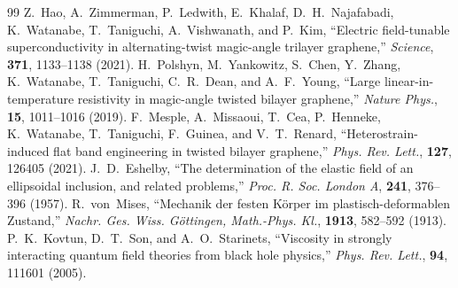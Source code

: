 \documentclass[12pt,a4paper]{article}
\begin{document}
\begin{thebibliography}{99}
	 Z.~Hao, A.~Zimmerman, P.~Ledwith, E.~Khalaf, D.~H.~Najafabadi, K.~Watanabe, T.~Taniguchi, A.~Vishwanath, and P.~Kim, ``Electric field-tunable superconductivity in alternating-twist magic-angle trilayer graphene,'' \textit{Science}, \textbf{371}, 1133--1138 (2021).
	 H.~Polshyn, M.~Yankowitz, S.~Chen, Y.~Zhang, K.~Watanabe, T.~Taniguchi, C.~R.~Dean, and A.~F.~Young, ``Large linear-in-temperature resistivity in magic-angle twisted bilayer graphene,'' \textit{Nature Phys.}, \textbf{15}, 1011--1016 (2019).
	 F.~Mesple, A.~Missaoui, T.~Cea, P.~Henneke, K.~Watanabe, T.~Taniguchi, F.~Guinea, and V.~T.~Renard, ``Heterostrain-induced flat band engineering in twisted bilayer graphene,'' \textit{Phys. Rev. Lett.}, \textbf{127}, 126405 (2021).
	 J.~D.~Eshelby, ``The determination of the elastic field of an ellipsoidal inclusion, and related problems,'' \textit{Proc. R. Soc. London A}, \textbf{241}, 376--396 (1957).
	 R.~von~Mises, ``Mechanik der festen K{\"o}rper im plastisch-deformablen Zustand,'' \textit{Nachr. Ges. Wiss. G{\"o}ttingen, Math.-Phys. Kl.}, \textbf{1913}, 582--592 (1913).
	 P.~K.~Kovtun, D.~T.~Son, and A.~O.~Starinets, ``Viscosity in strongly interacting quantum field theories from black hole physics,'' \textit{Phys. Rev. Lett.}, \textbf{94}, 111601 (2005).
\end{thebibliography}
\end{document}
